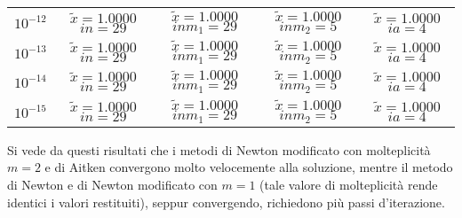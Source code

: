 \begin{center}
\begin{tabular}{|c|c|c|c|c|}
			$10^{-12}$ & $\tilde{x} = 1.0000$ \quad $in = 29$ & $\tilde{x} = 1.0000$ \quad $inm_1 = 29$ & $\tilde{x} = 1.0000$ \quad $inm_2 = 5$ & $\tilde{x} = 1.0000$ \quad $ia = 4$\\
			$10^{-13}$ & $\tilde{x} = 1.0000$ \quad $in = 29$ & $\tilde{x} = 1.0000$ \quad $inm_1 = 29$ & $\tilde{x} = 1.0000$ \quad $inm_2 = 5$ & $\tilde{x} = 1.0000$ \quad $ia = 4$\\
			$10^{-14}$ & $\tilde{x} = 1.0000$ \quad $in = 29$ & $\tilde{x} = 1.0000$ \quad $inm_1 = 29$ & $\tilde{x} = 1.0000$ \quad $inm_2 = 5$ & $\tilde{x} = 1.0000$ \quad $ia = 4$\\
			$10^{-15}$ & $\tilde{x} = 1.0000$ \quad $in = 29$ & $\tilde{x} = 1.0000$ \quad $inm_1 = 29$ & $\tilde{x} = 1.0000$ \quad $inm_2 = 5$ & $\tilde{x} = 1.0000$ \quad $ia = 4$\\
		\hline
	\end{tabular}
\end{center}
Si vede da questi risultati che i metodi di Newton modificato con molteplicità $m=2$ e di Aitken convergono molto velocemente alla soluzione, mentre il metodo di Newton e di Newton modificato con $m=1$ (tale valore di molteplicità rende identici i valori restituiti), seppur convergendo, richiedono più passi d'iterazione.